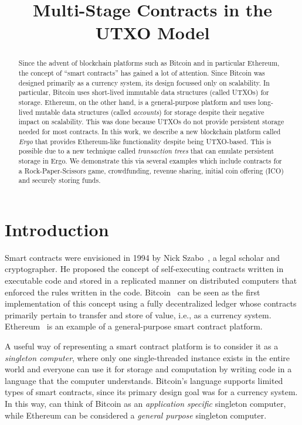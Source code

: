 \documentclass[runningheads]{llncs}
\begin{document}
\title{Multi-Stage Contracts in the UTXO Model}


\maketitle


\begin{abstract}
	
Since the advent of blockchain platforms such as Bitcoin and in particular Ethereum, the concept of ``smart contracts'' has gained a lot of attention. Since Bitcoin was designed primarily as a currency system, its design focussed only on scalability. In particular, Bitcoin uses short-lived immutable data structures (called UTXOs) for storage. Ethereum, on the other hand, is a general-purpose platform and uses long-lived mutable data structures (called {\em accounts}) for storage despite their negative impact on scalability. This was done because UTXOs do not provide persistent storage needed for most contracts.
In this work, we describe a new blockchain platform called {\em Ergo} that provides Ethereum-like functionality despite being UTXO-based. 
This is possible due to a new technique called {\em transaction trees} that can emulate persistent storage in Ergo. We demonstrate this via several examples which include contracts for a Rock-Paper-Scissors game, crowdfunding, revenue sharing, initial coin offering (ICO) and securely storing funds.

\end{abstract}


\section{Introduction}

Smart contracts were envisioned in 1994 by Nick Szabo~\cite{szabo1997idea}, a legal scholar and cryptographer. He proposed the concept of self-executing contracts written in executable code and stored in a replicated manner on distributed computers that enforced the rules written in the code. 
Bitcoin~\cite{Nak08} can be seen as the first implementation of this concept using a fully decentralized ledger whose contracts primarily pertain to transfer and store of value, i.e., as a currency system. 
Ethereum~\cite{wood2014ethereum} is an example of a general-purpose smart contract platform. 

A useful way of representing a smart contract platform is to consider it as a {\em singleton computer}, where only one single-threaded instance exists in the entire world and everyone can use it for storage and computation by writing code in a language that the computer understands.
Bitcoin's language supports limited types of smart contracts, since its primary design goal was for a currency system. In this way, can think of Bitcoin as an {\em application specific} singleton computer, while Ethereum can be considered a {\em general purpose} singleton computer.
\end{document}
